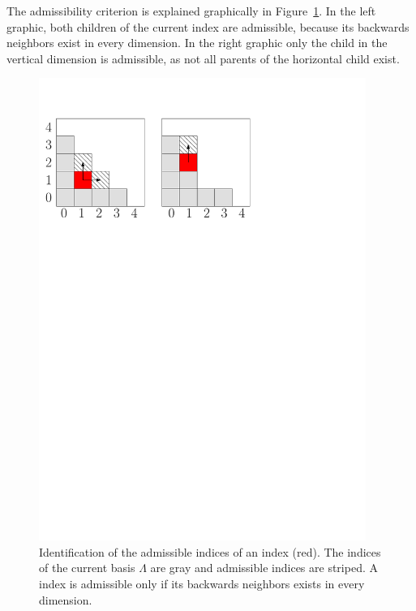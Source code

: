 The admissibility criterion is explained graphically in Figure~\ref{fig:index-dmissibiliy-examples}. In the left graphic, 
both children of the current index are admissible, because its backwards neighbors exist in every dimension. 
In the right graphic only the child in the vertical dimension is admissible,
as not all parents of the horizontal child exist. 
\begin{figure}[ht]
\begin{center}
\includegraphics[width=0.95\textwidth]{images/index-expansion}
\caption{Identification of the admissible indices of an index (red). The indices of the current basis $\Lambda$ are gray and admissible indices are striped. A index is admissible only if
its backwards neighbors exists in every dimension.}
\label{fig:index-dmissibiliy-examples}
\end{center}
\end{figure}

